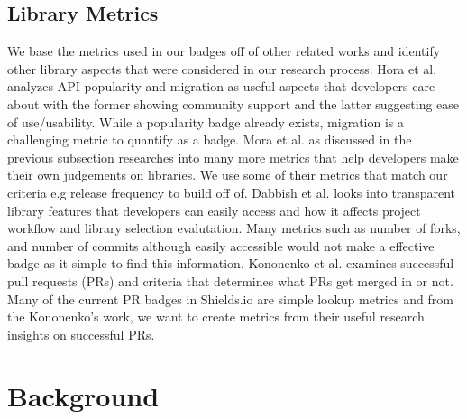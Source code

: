 \documentclass[12pt, letterpaper]{article}
\begin{document}
\subsection{Library Metrics}
We base the metrics used in our badges off of other related works and identify other library aspects
that were considered in our research process.
Hora et al. \cite{apiwave} analyzes API popularity and migration as useful aspects that developers care about
with the former showing community support and the latter suggesting ease of use/usability. 
While a popularity badge already exists, migration is a challenging metric to quantify as a badge.
Mora et al. \cite{metrics, empiricalmetrics} as discussed in the previous subsection researches into
many more metrics that help developers make their own judgements on libraries. We use some of their metrics
that match our criteria e.g release frequency to build off of. 
Dabbish et al. \cite{transparency} looks into transparent library features that developers can easily access
and how it affects project workflow and library selection evalutation. Many metrics such as number of forks,
and number of commits although easily accessible would not make a effective badge \cite{githubbadges}
as it simple to find this information. 
Kononenko et al. \cite{shopifyarticle} examines successful pull requests (PRs) and criteria that determines
what PRs get merged in or not. Many of the current PR badges in Shields.io \cite{shields}
are simple lookup metrics and from the Kononenko's work, we want
to create metrics from their useful research insights on successful PRs.

\section{Background}
\end{document}
